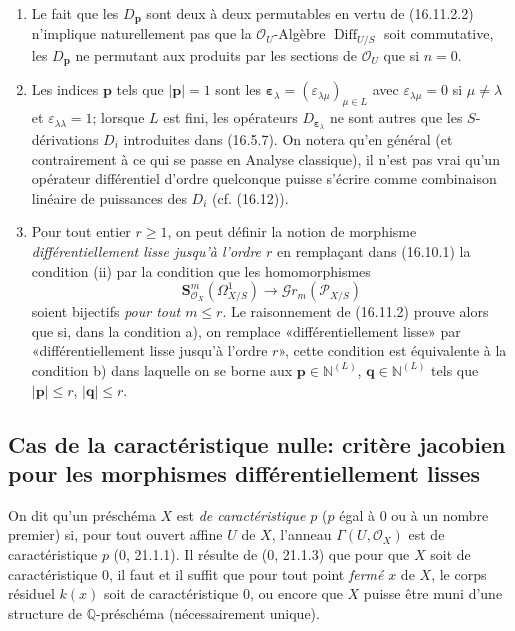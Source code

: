 \begin{remarks}[16.11.3]
\label{IV.16.11.3}
\begin{enumerate}
  \item[(i)] Le fait que les $D_{\mathbf{p}}$ sont deux à deux permutables en
  vertu de (16.11.2.2) n'implique naturellement pas que la
  $\mathcal{O}_U$-Algèbre $\operatorname{Diff}_{U/S}$ soit commutative, les
  $D_{\mathbf{p}}$ ne permutant aux produits par les sections de
  $\mathcal{O}_U$ que si $n=0$.
  \item[(ii)] Les indices $\mathbf{p}$ tels que $|\mathbf{p}|=1$ sont les
  $\boldsymbol{\varepsilon}_\lambda
  =(\varepsilon_{\lambda\mu})_{\mu\in L}$ avec
  $\varepsilon_{\lambda\mu}=0$ si $\mu\neq\lambda$ et
  $\varepsilon_{\lambda\lambda}=1$; lorsque $L$ est fini, les opérateurs
  $D_{\boldsymbol{\varepsilon}_\lambda}$ ne sont autres que les
  $S$-dérivations $D_i$ introduites dans (16.5.7). On notera qu'en général
  (et contrairement à ce qui se passe en Analyse classique), il n'est pas
  vrai qu'un opérateur différentiel d'ordre quelconque puisse s'écrire comme
  combinaison linéaire de puissances des $D_i$ (cf. (16.12)).
  \item[(iii)] Pour tout entier $r\geq1$, on peut définir la notion de
  morphisme \emph{différentiellement lisse jusqu'à l'ordre $r$} en remplaçant
  dans (16.10.1) la condition (ii) par la condition que les homomorphismes
  \[
    \mathbf{S}_{\mathcal{O}_X}^m(\Omega_{X/S}^1)
    \longrightarrow\mathscr{G}r_m(\mathscr{P}_{X/S})
  \]
  soient bijectifs \emph{pour tout $m\leq r$}. Le raisonnement de (16.11.2)
  prouve alors que si, dans la condition a), on remplace «différentiellement
  lisse» par «différentiellement lisse jusqu'à l'ordre $r$», cette condition
  est équivalente à la condition b) dans laquelle on se borne aux
  $\mathbf{p}\in\mathbb{N}^{(L)}$, $\mathbf{q}\in\mathbb{N}^{(L)}$ tels que
  $|\mathbf{p}|\leq r$, $|\mathbf{q}|\leq r$.
\end{enumerate}
\end{remarks}

\subsection{Cas de la caractéristique nulle: critère jacobien pour les
morphismes différentiellement lisses}
\label{IV.16.12}

\begin{env}[16.12.1]
\label{IV.16.12.1}
On dit qu'un préschéma $X$ est \emph{de caractéristique $p$} ($p$ égal à $0$
ou à un nombre premier) si, pour tout ouvert affine $U$ de $X$, l'anneau
$\Gamma(U,\mathcal{O}_X)$ est de caractéristique $p$ (0, 21.1.1). Il résulte
de (0, 21.1.3) que pour que $X$ soit de caractéristique $0$, il faut et il
suffit que pour tout point \emph{fermé} $x$ de $X$, le corps résiduel $k(x)$
soit de caractéristique $0$, ou encore que $X$ puisse être muni d'une
structure de $\mathbb{Q}$-préschéma (nécessairement unique).
\end{env}

